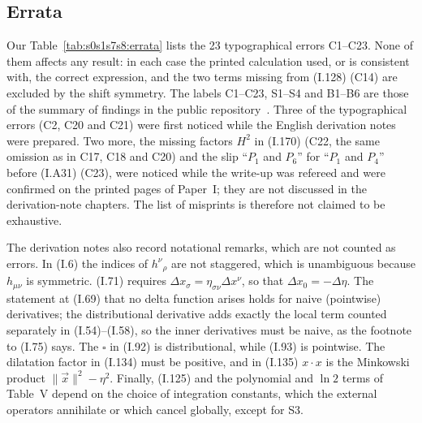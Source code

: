 \documentclass[aps,prd,onecolumn,10pt,nofootinbib,floatfix]{revtex4-2}
\newcommand{\eqI}[1]{(I.#1)}
\begin{document}
\subsection{Errata}

Our Table~\ref{tab:s0s1s7s8:errata} lists the 23 typographical errors C1--C23. None of them affects any result: in each case the
printed calculation used, or is consistent with, the correct expression, and the two terms missing from \eqI{128} (C14) are excluded by
the shift symmetry. The labels C1--C23, S1--S4 and B1--B6 are those of the summary of findings in the public
repository~\cite{ref:repo}. Three of the typographical errors (C2, C20 and C21) were first noticed while the English derivation notes
were prepared. Two more, the missing factors $H^2$ in \eqI{170} (C22, the same omission as in C17, C18 and C20) and the slip
``$P_1$ and $P_6$'' for ``$P_1$ and $P_4$'' before \eqI{A31} (C23), were noticed while the write-up was refereed and were confirmed
on the printed pages of Paper~I; they are not discussed in the derivation-note chapters. The list of misprints is therefore not
claimed to be exhaustive.

The derivation notes also record notational remarks, which are not counted as errors. In \eqI{6} the indices of $h^\nu{}_\rho$ are
not staggered, which is unambiguous because $h_{\mu\nu}$ is symmetric. \eqI{71} requires $\Delta x_\sigma=\eta_{\sigma\nu}\Delta
x^\nu$, so that $\Delta x_0=-\Delta\eta$. The statement at \eqI{69} that no delta function arises holds for naive (pointwise)
derivatives; the distributional derivative adds exactly the local term counted separately in \eqI{54}--\eqI{58}, so the inner
derivatives must be naive, as the footnote to \eqI{75} says. The $\square$ in \eqI{92} is distributional, while \eqI{93} is pointwise.
The dilatation factor in \eqI{134} must be positive, and in \eqI{135} $x\cdot x$ is the Minkowski product $\|\vec x\|^2-\eta^2$.
Finally, \eqI{125} and the polynomial and $\ln2$ terms of Table~V depend on the choice of integration constants, which the external
operators annihilate or which cancel globally, except for S3.
\end{document}
